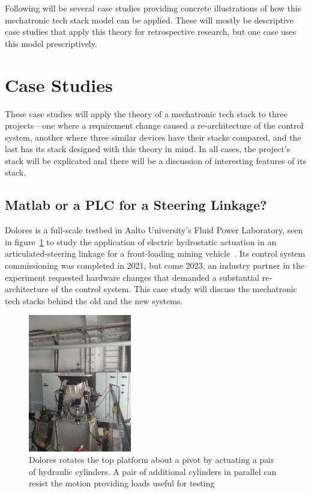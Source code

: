 \documentclass[english,12pt,a4paper,pdftex,eng,utf8]{aaltothesis}
\begin{document}
Following will be several case studies providing concrete illustrations of how this mechatronic tech stack model can be applied.  These will mostly be descriptive case studies that apply this theory for retrospective research, but one case uses this model prescriptively.

\clearpage

\section{Case Studies}\label{sec:case_studies}

These case studies will apply the theory of a mechatronic tech stack to three projects---one where a requirement change caused a re-architecture of the control system, another where three similar devices have their stacks compared, and the last has its stack designed with this theory in mind.  In all cases, the project's stack will be explicated and there will be a discussion of interesting features of its stack.

\subsection{Matlab or a PLC for a Steering Linkage?}

Dolores is a full-scale testbed in Aalto University's Fluid Power Laboratory, seen in figure~\ref{fig:dolores0} to study the application of electric hydrostatic actuation in an articulated-steering linkage for a front-loading mining vehicle~\cite{Hermansson2021, Helduser1999, Dudzinski1989}.  Its control system commissioning was completed in 2021, but come 2023, an industry partner in the experiment requested hardware changes that demanded a substantial re-architecture of the control system.  This case study will discuss the mechatronic tech stacks behind the old and the new systems.

\begin{figure}[h]
  \centering
  \includegraphics[width=0.4\textwidth]{assets/dolores}
  \caption{Dolores rotates the top platform about a pivot by actuating a pair of hydraulic cylinders.  A pair of additional cylinders in parallel can resist the motion providing loads useful for testing}\label{fig:dolores0}
\end{figure}
\end{document}
